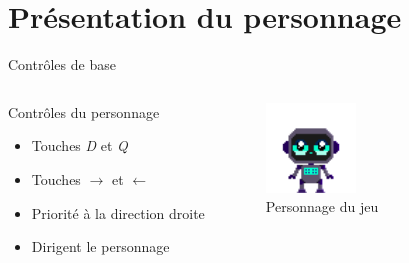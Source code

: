 \documentclass{beamer}
\begin{document}
{\section{Présentation du personnage}
\begin{frame}{Contrôles de base}
    \begin{columns}
            \begin{block}{Contrôles du personnage}
                \begin{itemize}
                    \item[\bullet] Touches \emph{D} et \emph{Q}
                    \item[\bullet] Touches $\rightarrow$ et $\leftarrow$
                    \item[\bullet] Priorité à la direction droite
                    \item[\bullet] Dirigent le personnage
                \end{itemize}
            \end{block}
            \begin{figure}
                \centering
                \includegraphics[width=0.8\textwidth]{character_placeholder.png}
                \caption{Personnage du jeu}
            \end{figure}
    \end{columns}
\end{frame}

}
\end{document}
